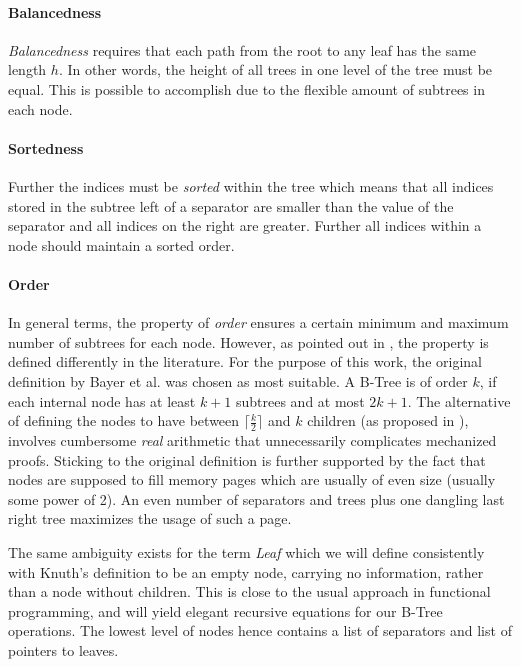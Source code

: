 \paragraph{Balancedness} \textit{Balancedness} requires
that each path from the root to any leaf has the same length $h$.
In other words, the height of all trees in one level of the tree must be equal.
This is possible to accomplish due to the flexible amount of subtrees
in each node.

\paragraph{Sortedness} Further the indices must be \textit{sorted} within the tree which means that all indices stored
in the subtree left of a separator are smaller than the value of the separator
and all indices on the right are greater.
Further all indices within a node should maintain a sorted order.

\paragraph{Order} In general terms, the property of \textit{order} ensures a certain minimum and maximum
number of subtrees for each node.
However, as pointed out in \parencite{DBLP:books/daglib/0095349_mod},
the property is defined differently in the literature.
For the purpose of this work, the original definition by Bayer et al. was chosen as most suitable.
A B-Tree is of order $k$, if each internal node has at least $k+1$
subtrees and at most $2k+1$.
The alternative of defining the nodes to have between $\lceil \frac{k}{2} \rceil$
and $k$ children (as proposed in \parencite{DBLP:books/lib/Knuth98a}),
involves cumbersome \textit{real} arithmetic that unnecessarily complicates
mechanized proofs.
Sticking to the original definition is further supported by the fact that nodes are supposed
to fill memory pages which are usually of even size (usually some power of 2).
An even number of separators and trees plus one dangling last right tree maximizes
the usage of such a page.

The same ambiguity exists for the term \textit{Leaf} which we will define consistently with Knuth's definition \parencite{DBLP:books/lib/Knuth98a}
to be an empty node, carrying no information,
rather than a node without children.
This is close to the usual approach in functional programming,
and will yield elegant recursive equations for our B-Tree operations.
The lowest level of nodes hence contains a list of separators and
list of pointers to leaves.

